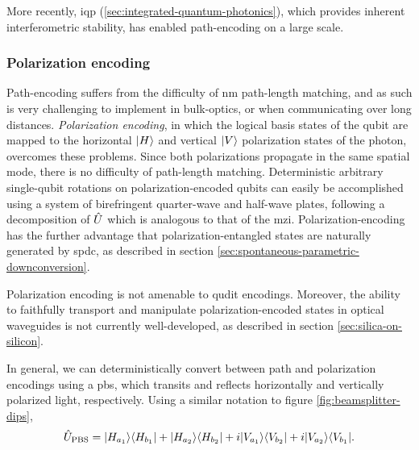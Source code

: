 More recently, \gls{iqp} (\ref{sec:integrated-quantum-photonics}), which provides inherent interferometric stability, has enabled path-encoding on a large scale.

\subsubsection{Polarization encoding}
\label{sec:polarization-encoding}
Path-encoding suffers from the difficulty of \si{\nano \metre} path-length matching, and as such is very challenging to implement in bulk-optics, or when communicating over long distances. \emph{Polarization encoding}, in which the logical basis states of the qubit are mapped to the horizontal $\mbox{$ | H \rangle $}$ and vertical $\mbox{$ | V \rangle $}$ polarization states of the photon, overcomes these problems. Since both polarizations propagate in the same spatial mode, there is no difficulty of path-length matching. Deterministic arbitrary single-qubit rotations on polarization-encoded qubits can easily be accomplished using a system of birefringent quarter-wave and half-wave plates, following a decomposition of $\hat{U}$ which is analogous to that of the \gls{mzi}. Polarization-encoding has the further advantage that polarization-entangled states are naturally generated by \gls{spdc}, as described in section \ref{sec:spontaneous-parametric-downconversion}.

Polarization encoding is not amenable to qudit encodings. Moreover, the ability to faithfully transport and manipulate polarization-encoded states in optical waveguides is not currently well-developed, as described in section \ref{sec:silica-on-silicon}.

In general, we can deterministically convert between path and polarization encodings using a \gls{pbs}, which transits and reflects horizontally and vertically polarized light, respectively. Using a similar notation to figure \ref{fig:beamsplitter-dips},
\begin{equation}
    \hat{U}_\mathrm{PBS} = 
    \mbox{$ | H_{a_1} \rangle $}\mbox{$ \langle H_{b_1} | $} +
    \mbox{$ | H_{a_2} \rangle $}\mbox{$ \langle H_{b_2} | $} +
    i\mbox{$ | V_{a_1} \rangle $}\mbox{$ \langle V_{b_2} | $} +
    i\mbox{$ | V_{a_2} \rangle $}\mbox{$ \langle V_{b_1} | $} 
    .
\end{equation}

